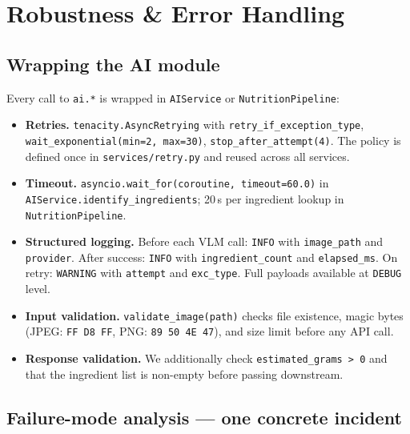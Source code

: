 \documentclass[11pt,a4paper]{article}
\begin{document}
\section{Robustness \& Error Handling}\label{sec:robustness}

\subsection{Wrapping the AI module}

Every call to \texttt{ai.*} is wrapped in \texttt{AIService} or \texttt{NutritionPipeline}:

\begin{itemize}[topsep=4pt,itemsep=3pt]
  \item \textbf{Retries.}
    \texttt{tenacity.AsyncRetrying} with \texttt{retry\_if\_exception\_type}, \texttt{wait\_exponential(min=2, max=30)}, \texttt{stop\_after\_attempt(4)}.
    The policy is defined once in \texttt{services/retry.py} and reused across all services.

  \item \textbf{Timeout.}
    \texttt{asyncio.wait\_for(coroutine, timeout=60.0)} in \texttt{AIService.identify\_ingredients};
    20\,s per ingredient lookup in \texttt{NutritionPipeline}.

  \item \textbf{Structured logging.}
    Before each VLM call: \texttt{INFO} with \texttt{image\_path} and \texttt{provider}.
    After success: \texttt{INFO} with \texttt{ingredient\_count} and \texttt{elapsed\_ms}.
    On retry: \texttt{WARNING} with \texttt{attempt} and \texttt{exc\_type}.
    Full payloads available at \texttt{DEBUG} level.

  \item \textbf{Input validation.}
    \texttt{validate\_image(path)} checks file existence, magic bytes
    (JPEG: \texttt{FF D8 FF}, PNG: \texttt{89 50 4E 47}), and size limit before any API call.

  \item \textbf{Response validation.}
    We additionally check \texttt{estimated\_grams > 0} and that the ingredient list is non-empty
    before passing downstream.
\end{itemize}

\subsection{Failure-mode analysis --- one concrete incident}
\end{document}
